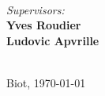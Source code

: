 \documentclass[a4paper,12pt,oneside]{report}
\begin{document}
\begin{titlepage}
\begin{minipage}{0.57\textwidth}
\begin{flushleft}
\end{flushleft}
\end{minipage}
~
\begin{minipage}{0.4\textwidth}
\begin{flushright} 
\emph{Supervisors:} \\
\textbf{Yves Roudier} \\
\textbf{Ludovic Apvrille} \\

\end{flushright}

\end{minipage}\\[3cm]



{ Biot, \today}\\[3cm] %


 

\vfill %

\end{titlepage}
\linespread{1.3}

\end{document}
